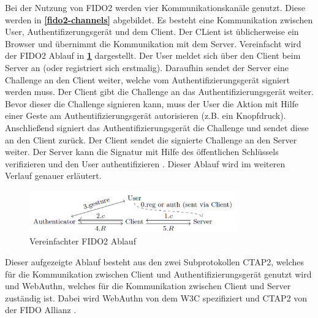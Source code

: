 Bei der Nutzung von \ac{FIDO}2 werden vier Kommunikationskanäle genutzt. Diese werden in \textbf{\ref{fido2-channels}} abgebildet. Es besteht eine Kommunikation zwischen User, Authentifizerungsgerät und dem Client. Der CLient ist üblicherweise ein Browser und übernimmt die Kommunikation mit dem Server. Vereinfacht wird der \ac{FIDO}2 Ablauf in \textbf{\ref{fido2-simple}} dargestellt. Der User meldet sich über den Client beim Server an (oder registriert sich erstmalig). Daraufhin sendet der Server eine Challenge an den Client weiter, welche vom Authentifizierungsgerät signiert werden muss. Der Client gibt die Challenge an das Authentifizierungsgerät weiter. Bevor dieser die Challenge signieren kann, muss der User die Aktion mit Hilfe einer Geste am Authentifizierungsgerät autorisieren (z.B. ein Knopfdruck). Anschließend signiert das Authentifizierungsgerät die Challenge und sendet diese an den Client zurück. Der Client sendet die signierte Challenge an den Server weiter. Der Server kann die Signatur mit Hilfe des öffentlichen Schlüssels verifizieren und den User authentifizieren \cite{lyastani2020fido2} \cite{farke2020you}. Dieser Ablauf wird im weiteren Verlauf genauer erläutert.

\begin{figure}[h]
	\centering 
	\includegraphics[width=0.8\textwidth]{img/abbildungen/fido2_flow.png}
	\captionsetup{format=hang}
	\caption{Vereinfachter FIDO2 Ablauf} \label{fido2-simple}
\end{figure}

Dieser aufgezeigte Ablauf besteht aus den zwei Subprotokollen \ac{CTAP2}, welches für die Kommunikation zwischen Client und Authentifizierungsgerät genutzt wird und WebAuthn, welches für die Kommunikation zwischen Client und Server zuständig ist. Dabei wird WebAuthn von dem \ac{W3C} spezifiziert und \ac{CTAP2} von der \ac{FIDO} Allianz \cite{farke2020you}.

